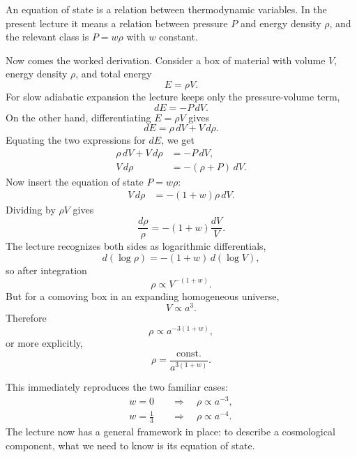 \begin{definition}
An equation of state is a relation between thermodynamic variables. In the present lecture it means a relation between pressure \(P\) and energy density \(\rho\), and the relevant class is \(P=w\rho\) with \(w\) constant.
\end{definition}

Now comes the worked derivation. Consider a box of material with volume \(V\), energy density \(\rho\), and total energy
\begin{equation}
E=\rho V .
\end{equation}
For slow adiabatic expansion the lecture keeps only the pressure-volume term,
\begin{equation}
dE=-P\,dV .
\end{equation}
On the other hand, differentiating \(E=\rho V\) gives
\begin{equation}
dE = \rho\, dV + V\, d\rho .
\end{equation}
Equating the two expressions for \(dE\), we get
\begin{align}
\rho\, dV + V\, d\rho &= -P\, dV, \\
V\, d\rho &= -(\rho+P)\, dV .
\end{align}
Now insert the equation of state \(P=w\rho\):
\begin{align}
V\, d\rho &= -(1+w)\rho\, dV .
\end{align}
Dividing by \(\rho V\) gives
\begin{equation}
\frac{d\rho}{\rho} = -(1+w)\frac{dV}{V}.
\end{equation}
The lecture recognizes both sides as logarithmic differentials,
\begin{equation}
d(\log \rho) = -(1+w)\, d(\log V),
\end{equation}
so after integration
\begin{equation}
\rho \propto V^{-(1+w)}.
\end{equation}
But for a comoving box in an expanding homogeneous universe,
\begin{equation}
V \propto a^3 .
\end{equation}
Therefore
\begin{equation}
\rho \propto a^{-3(1+w)},
\end{equation}
or more explicitly,
\begin{equation}
\rho = \frac{\text{const.}}{a^{3(1+w)}} .
\end{equation}

This immediately reproduces the two familiar cases:
\begin{align}
w=0 &\quad \Longrightarrow \quad \rho \propto a^{-3}, \\
w=\frac13 &\quad \Longrightarrow \quad \rho \propto a^{-4}.
\end{align}
The lecture now has a general framework in place: to describe a cosmological component, what we need to know is its equation of state.


